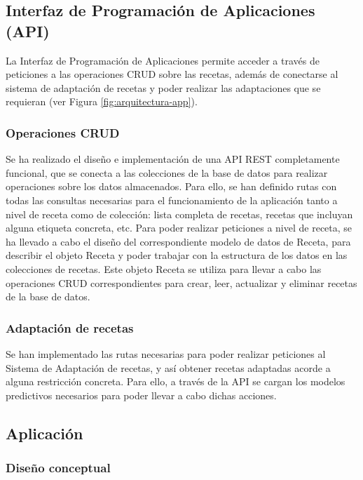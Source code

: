 \subsection{Interfaz de Programación de Aplicaciones (API)}

La Interfaz de Programación de Aplicaciones permite acceder a través de peticiones a las operaciones CRUD sobre las recetas, además de conectarse al sistema de adaptación de recetas y poder realizar las adaptaciones que se requieran (ver Figura \ref{fig:arquitectura-app}). 

\subsubsection{Operaciones CRUD}

Se ha realizado el diseño e implementación de una API REST completamente funcional, que se conecta a las colecciones de la base de datos para realizar operaciones sobre los datos almacenados. Para ello, se han definido rutas con todas las consultas necesarias para el funcionamiento de la aplicación tanto a nivel de receta como de colección: lista completa de recetas, recetas que incluyan alguna etiqueta concreta, etc. Para poder realizar peticiones a nivel de receta, se ha llevado a cabo el diseño del correspondiente modelo de datos de Receta, para describir el objeto Receta y poder trabajar con la estructura de los datos en las colecciones de recetas. Este objeto Receta se utiliza para llevar a cabo las operaciones CRUD correspondientes para crear, leer, actualizar y eliminar recetas de la base de datos.


\subsubsection{Adaptación de recetas}

Se han implementado las rutas necesarias para poder realizar peticiones al Sistema de Adaptación de recetas, y así obtener recetas adaptadas acorde a alguna restricción concreta. Para ello, a través de la API se cargan los modelos predictivos necesarios para poder llevar a cabo dichas acciones.

\subsection{Aplicación}

\subsubsection{Diseño conceptual}

